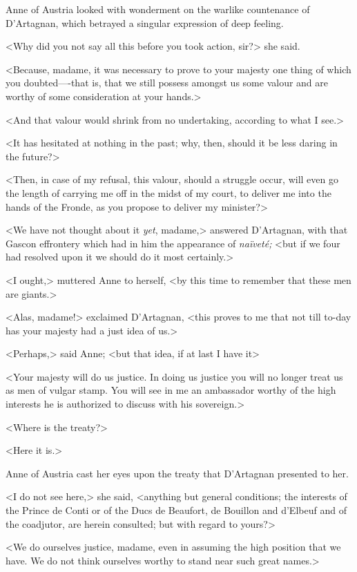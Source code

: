 Anne of Austria looked with wonderment on the warlike countenance of D'Artagnan, which betrayed a singular expression of deep feeling.

<Why did you not say all this before you took action, sir?> she said.

<Because, madame, it was necessary to prove to your majesty one thing of which you doubted—-that is, that we still possess amongst us some valour and are worthy of some consideration at your hands.>

<And that valour would shrink from no undertaking, according to what I see.>

<It has hesitated at nothing in the past; why, then, should it be less daring in the future?>

<Then, in case of my refusal, this valour, should a struggle occur, will even go the length of carrying me off in the midst of my court, to deliver me into the hands of the Fronde, as you propose to deliver my minister?>

<We have not thought about it \textit{yet}, madame,> answered D'Artagnan, with that Gascon effrontery which had in him the appearance of \textit{naïveté;} <but if we four had resolved upon it we should do it most certainly.>

<I ought,> muttered Anne to herself, <by this time to remember that these men are giants.>

<Alas, madame!> exclaimed D'Artagnan, <this proves to me that not till to-day has your majesty had a just idea of us.>

<Perhaps,> said Anne; <but that idea, if at last I have it\longdash>

<Your majesty will do us justice. In doing us justice you will no longer treat us as men of vulgar stamp. You will see in me an ambassador worthy of the high interests he is authorized to discuss with his sovereign.>

<Where is the treaty?>

<Here it is.>

Anne of Austria cast her eyes upon the treaty that D'Artagnan presented to her.

<I do not see here,> she said, <anything but general conditions; the interests of the Prince de Conti or of the Ducs de Beaufort, de Bouillon and d'Elbeuf and of the coadjutor, are herein consulted; but with regard to yours?>

<We do ourselves justice, madame, even in assuming the high position that we have. We do not think ourselves worthy to stand near such great names.>

